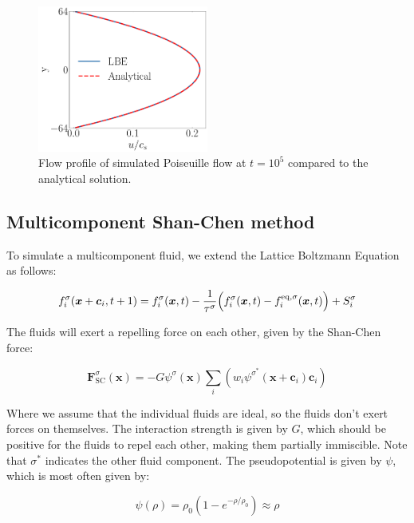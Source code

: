 \begin{figure}[htp]
    \centering
    \includegraphics[width=0.5\textwidth]{figures/poiseuille.pdf}
    \caption{Flow profile of simulated Poiseuille flow at $t=10^5$ compared to the analytical solution.}\label{fig:poiseuille}
\end{figure}

\subsection{Multicomponent Shan-Chen method}
To simulate a multicomponent fluid, we extend the Lattice Boltzmann Equation as follows:

\begin{equation}\label{eq:Lattice Boltzmann Equation multicomponent}
    f_i^{\sigma}(\bm{x} + \bm{c}_i, t + 1) = f_i^{\sigma}(\bm{x}, t) - \frac{1}{\tau^{\sigma}}\Bigl(f_i^{\sigma}(\bm{x}, t) - f_i^{\text{eq}, \sigma}(\bm{x}, t)\Bigr) + S_i^{\sigma} 
\end{equation}

The fluids will exert a repelling force on each other, given by the Shan-Chen force:

\begin{equation}\label{eq:Shan-Chen force}
    \bm{F}^{\sigma}_{\text{SC}}(\bm{x}) = -G \psi^{\sigma}(\bm{x}) \sum_i \left(w_i \psi^{\sigma^\ast}(\bm{x} + \bm{c}_i) \bm{c}_i \right) 
\end{equation}

Where we assume that the individual fluids are ideal, so the fluids don't exert forces on themselves. The interaction strength is given by $G$, which should be positive for the fluids to repel each other, making them partially immiscible. Note that $\sigma^\ast$ indicates the other fluid component. The pseudopotential is given by $\psi$, which is most often given by:

\begin{equation}\label{eq:Pseudopotential}
    \psi(\rho) = \rho_0 \left(1 - e^{-\rho/\rho_0}\right) \approx \rho
\end{equation}


